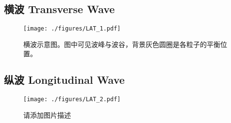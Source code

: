 
\subsection{横波 Transverse Wave}
\begin{figure}[ht]
\centering
\texttt{[image: ./figures/LAT\_1.pdf]}
\caption{横波示意图。图中可见波峰与波谷，背景灰色圆圈是各粒子的平衡位置。} \label{LAT_fig1}
\end{figure}


\subsection{纵波 Longitudinal Wave}
\begin{figure}[ht]
\centering
\texttt{[image: ./figures/LAT\_2.pdf]}
\caption{请添加图片描述} \label{LAT_fig2}
\end{figure}